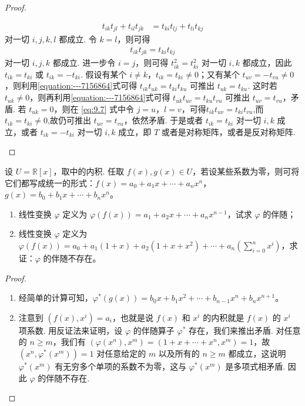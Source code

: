 \documentclass[../../main.tex]{subfiles}%
\begin{document}
\begin{proof}
\begin{enumerate}[(1)]
\begin{align}
t_{ik}t_{jl}+t_{il}t_{jk}&=t_{ki}t_{lj}+t_{li}t_{kj}\label{eq:9.7}
\end{align}
对一切 \(i,j,k,l\) 都成立. 令 \(k = l\)，则可得
\begin{align}\label{equation:---7156864}
t_{ik}t_{jk}=t_{ki}t_{kj}
\end{align}
对一切 \(i,j,k\) 都成立. 进一步令 \(i = j\)，则可得 \(t_{ik}^2 = t_{ki}^2\) 对一切 \(i,k\) 都成立，因此 \(t_{ik}=t_{ki}\) 或 \(t_{ik}=-t_{ki}\). 假设有某个 \(i\neq k\)，\(t_{ik}=t_{ki}\neq0\)；又有某个 \(t_{uv}=-t_{vu}\neq0\)，则利用\eqref{equation:---7156864}式可得 \(t_{ik}t_{uk}=t_{ki}t_{ku}\) 可推出 \(t_{uk}=t_{ku}\). 这时若 \(t_{uk}\neq0\)，则再利用\eqref{equation:---7156864}式可得 \(t_{uk}t_{uv}=t_{ku}t_{vu}\) 可推出 \(t_{uv}=t_{vu}\)，矛盾. 若 \(t_{uk}=0\)，则在 \eqref{eq:9.7} 式中令 \(j = u\)，\(l = v\)，可得$t_{ik}t_{uv}=t_{ki}t_{vu}$,而\(t_{ik}=t_{ki}\neq0\),故仍可推出 \(t_{uv}=t_{vu}\)，依然矛盾. 于是或者 \(t_{ik}=t_{ki}\) 对一切 \(i,k\) 成立，或者 \(t_{ik}=-t_{ki}\) 对一切 \(i,k\) 成立，即 \(T\) 或者是对称矩阵，或者是反对称矩阵.
\end{enumerate} 
\end{proof}

\begin{proposition}\label{proposition:例9.31}
设 \(U = \mathbb{R}[x]\)，取中的内积. 任取 \(f(x),g(x)\in U\)，若设某些系数为零，则可将它们都写成统一的形式：\(f(x)=a_0 + a_1x+\cdots + a_nx^n\)，\(g(x)=b_0 + b_1x+\cdots + b_nx^n\)。
\begin{enumerate}[(1)]
\item 线性变换 \(\varphi\) 定义为 \(\varphi(f(x))=a_1 + a_2x+\cdots + a_nx^{n - 1}\)，试求 \(\varphi\) 的伴随；
\item 线性变换 \(\varphi\) 定义为 \(\varphi(f(x))=a_0 + a_1(1 + x)+a_2(1 + x + x^2)+\cdots + a_n(\sum_{i = 0}^{n}x^i)\)，求证：\(\varphi\) 的伴随不存在。
\end{enumerate}
\end{proposition}
\begin{proof}
\begin{enumerate}[(1)]
\item 经简单的计算可知，\(\varphi^*(g(x))=b_0x + b_1x^2+\cdots + b_{n - 1}x^n + b_nx^{n + 1}\)。
\item 注意到 \((f(x),x^i)=a_i\)，也就是说 \(f(x)\) 和 \(x^i\) 的内积就是 \(f(x)\) 的 \(x^i\) 项系数. 用反证法来证明，设 \(\varphi\) 的伴随算子 \(\varphi^*\) 存在，我们来推出矛盾. 对任意的 \(n\geqslant  m\)，我们有 \((\varphi(x^n),x^m)=(1 + x+\cdots + x^n,x^m)=1\)，故 \((x^n,\varphi^*(x^m)) = 1\) 对任意给定的 \(m\) 以及所有的 \(n\geqslant  m\) 都成立，这说明 \(\varphi^*(x^m)\) 有无穷多个单项的系数不为零，这与 \(\varphi^*(x^m)\) 是多项式相矛盾. 因此 \(\varphi\) 的伴随不存在.
\end{enumerate} 
\end{proof}
\end{document}
